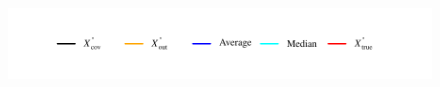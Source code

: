 \documentclass[11pt]{article}
\theoremstyle{definition}
\theoremstyle{definition}
\begin{document}
%

\begin{figure}[t!]
\vspace{-2em}
\centering
\hspace*{1em} 	\includegraphics{legendSim2.pdf} %
\vspace{-4 em}


\end{figure}
\end{document}
